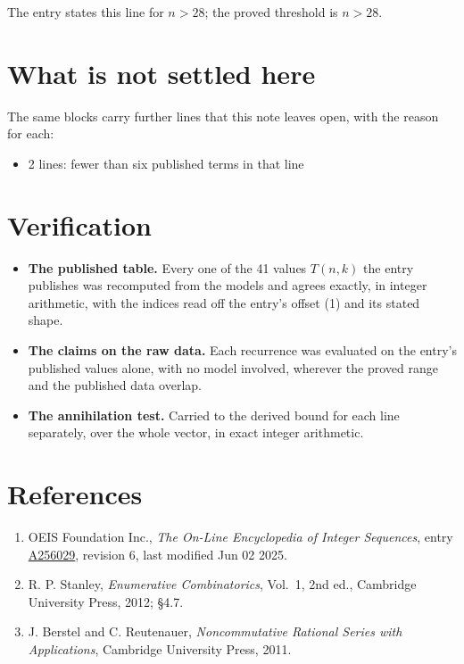 \documentclass[11pt]{article}
\theoremstyle{definition}
\begin{document}
The entry states this line for $n > 28$; the proved threshold is $n > 28$.

\section{What is not settled here}

The same blocks carry further lines that this note leaves open, with the reason for each:

\begin{itemize}

\item 2 lines: fewer than six published terms in that line

\end{itemize}

\section{Verification}

\begin{itemize}

\item {\bfseries The published table.} Every one of the 41 values $T(n,k)$ the entry publishes was recomputed from the models and agrees exactly, in integer arithmetic, with the indices read off the entry's offset (1) and its stated shape.

\item {\bfseries The claims on the raw data.} Each recurrence was evaluated on the entry's published values alone, with no model involved, wherever the proved range and the published data overlap.

\item {\bfseries The annihilation test.} Carried to the derived bound for each line separately, over the whole vector, in exact integer arithmetic.

\end{itemize}

\section{References}

\begin{enumerate}

\item OEIS Foundation Inc., \emph{The On-Line Encyclopedia of Integer Sequences}, entry \href{https://oeis.org/A256029}{A256029}, revision 6, last modified Jun 02 2025.

\item R. P. Stanley, \emph{Enumerative Combinatorics}, Vol.~1, 2nd ed., Cambridge University Press, 2012; \S4.7.

\item J. Berstel and C. Reutenauer, \emph{Noncommutative Rational Series with Applications}, Cambridge University Press, 2011.

\end{enumerate}
\end{document}
